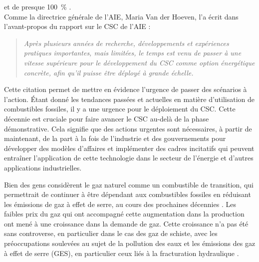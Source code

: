  et  de presque \SI{100}{\percent} \citep{WEO2014}.\\
Comme la directrice générale de l'AIE, Maria Van der Hoeven, l'a écrit dans
l'avant-propos du rapport sur le CSC de l'AIE
\citep{IEACCS2013}:\begin{quotation} \emph{Après plusieurs années de recherche,
développements et expériences pratiques importantes, mais limitées, le temps est venu de passer à une vitesse supérieure pour le développement du CSC comme
option énergétique concrète, afin qu'il puisse être déployé à grande
échelle.}\end{quotation}
Cette citation permet de mettre en évidence l'urgence de passer des scénarios à
l'action. Étant donné les tendances passées et actuelles en matière
d’utilisation de combustibles fossiles, il y a une urgence pour le déploiement
du CSC. Cette décennie est cruciale pour faire avancer le CSC au-delà de la phase
démonstrative. Cela signifie que des actions urgentes sont nécessaires, à partir
de maintenant, de la part à la fois de l'industrie et des gouvernements pour
développer des modèles d'affaires et implémenter des cadres incitatifs qui
peuvent entraîner l'application de cette technologie dans le secteur de
l'énergie et d'autres applications industrielles. \par

Bien des gens considèrent le gaz naturel comme un combustible de transition, qui
permettrait de continuer à être dépendant aux combustibles fossiles en réduisant
les émissions de gaz à effet de serre, au cours des prochaines décennies
\citep{Pacala2004}.
Les faibles prix du gaz qui ont accompagné cette augmentation dans la production
ont mené à une croissance dans la demande de gaz. Cette croissance n'a pas été
sans controverse, en particulier dans le cas des gaz de schiste, avec les préoccupations soulevées au sujet de la pollution des
eaux \citep{Osborn2011} et les émissions des gaz à effet de serre (GES), en
particulier ceux liés à la fracturation hydraulique
\citep{Howarth2011a,Howarth2011b}.
